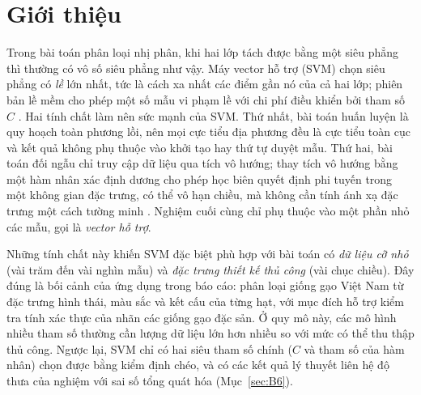 \section{Giới thiệu}\label{sec:intro}

Trong bài toán phân loại nhị phân, khi hai lớp tách được bằng một siêu phẳng thì thường có vô số
siêu phẳng như vậy. Máy vector hỗ trợ (SVM) chọn siêu phẳng có \emph{lề} lớn nhất, tức là cách xa
nhất các điểm gần nó của cả hai lớp; phiên bản lề mềm cho phép một số mẫu vi phạm lề với chi phí
điều khiển bởi tham số $C$ \citep{cortes1995support}. Hai tính chất làm nên sức mạnh của SVM.
Thứ nhất, bài toán huấn luyện là quy hoạch toàn phương lồi, nên mọi cực tiểu địa phương đều là cực
tiểu toàn cục và kết quả không phụ thuộc vào khởi tạo hay thứ tự duyệt mẫu. Thứ hai, bài toán đối ngẫu chỉ truy
cập dữ liệu qua tích vô hướng; thay tích vô hướng bằng một hàm nhân xác định dương cho phép học biên
quyết định phi tuyến trong một không gian đặc trưng, có thể vô hạn chiều, mà không cần tính ánh xạ
đặc trưng một cách tường minh \citep{scholkopf2002learning}. Nghiệm cuối cùng chỉ phụ thuộc vào một
phần nhỏ các mẫu, gọi là \emph{vector hỗ trợ}.

Những tính chất này khiến SVM đặc biệt phù hợp với bài toán có \emph{dữ liệu cỡ nhỏ} (vài trăm đến
vài nghìn mẫu) và \emph{đặc trưng thiết kế thủ công} (vài chục chiều). Đây đúng là bối cảnh của ứng
dụng trong báo cáo: phân loại giống gạo Việt Nam từ đặc trưng hình thái, màu sắc và kết cấu của
từng hạt, với mục đích hỗ trợ kiểm tra tính xác thực của nhãn các giống gạo đặc sản. Ở quy mô này,
các mô hình nhiều tham số thường cần lượng dữ liệu lớn hơn nhiều so với mức có thể thu thập thủ
công. Ngược lại, SVM chỉ có hai siêu tham số chính ($C$ và tham số của hàm nhân) chọn được bằng
kiểm định chéo, và có các kết quả lý thuyết liên hệ độ thưa của nghiệm với sai số tổng quát hóa
(Mục~\ref{sec:B6}).

